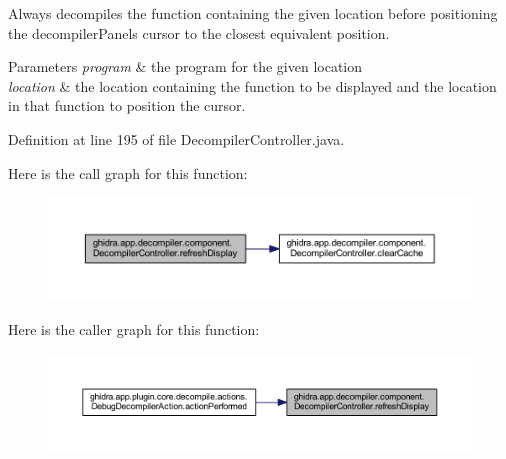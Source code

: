 Always decompiles the function containing the given location before positioning the decompiler\+Panel\textquotesingle{}s cursor to the closest equivalent position. 
\begin{DoxyParams}{Parameters}
{\em program} & the program for the given location \\
\hline
{\em location} & the location containing the function to be displayed and the location in that function to position the cursor. \\
\hline
\end{DoxyParams}


Definition at line 195 of file Decompiler\+Controller.\+java.

Here is the call graph for this function\+:
\nopagebreak
\begin{figure}[H]
\begin{center}
\leavevmode
\includegraphics[width=350pt]{classghidra_1_1app_1_1decompiler_1_1component_1_1_decompiler_controller_aacd96bcc0c2f85e8e96bde2ad5fd71d7_cgraph}
\end{center}
\end{figure}
Here is the caller graph for this function\+:
\nopagebreak
\begin{figure}[H]
\begin{center}
\leavevmode
\includegraphics[width=350pt]{classghidra_1_1app_1_1decompiler_1_1component_1_1_decompiler_controller_aacd96bcc0c2f85e8e96bde2ad5fd71d7_icgraph}
\end{center}
\end{figure}
\mbox{\label{classghidra_1_1app_1_1decompiler_1_1component_1_1_decompiler_controller_a356099cd8c037d53eb60317815d7586a}} 
